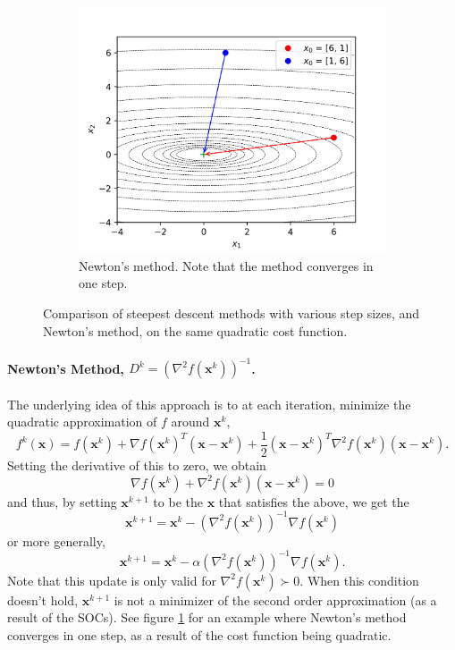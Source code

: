 \begin{figure}[!t]
\begin{subfigure}[b]{0.46\linewidth}
        \centering
        \includegraphics[width=\textwidth]{figs/newtonmethod.png}
        \caption{Newton's method. Note that the method converges in one step.}
        \label{fig:graddesc_newton}
    \end{subfigure}
    \caption{Comparison of steepest descent methods with various step sizes, and Newton's method, on the same quadratic cost function.}
    \label{fig:gradient_descent}
\end{figure}

\paragraph{Newton's Method, $D^k = (\nabla^2 f(\bm{x}^k))^{-1}$.} The underlying idea of this approach is to at each iteration, minimize the quadratic approximation of $f$ around $\bm{x}^k$,
\begin{equation}
    f^k(\bm{x}) = f(\bm{x}^k) + \nabla f(\bm{x}^k)^T (\bm{x} - \bm{x}^k) + \frac{1}{2} (\bm{x} - \bm{x}^k)^T \nabla^2 f(\bm{x}^k) (\bm{x} - \bm{x}^k).
\end{equation}
Setting the derivative of this to zero, we obtain 
\begin{equation}
    \nabla f(\bm{x}^k) + \nabla^2 f(\bm{x}^k) (\bm{x} - \bm{x}^k) = 0
\end{equation}
and thus, by setting $\bm{x}^{k+1}$ to be the $\bm{x}$ that satisfies the above, we get the
\begin{equation}
    \bm{x}^{k+1} = \bm{x}^k - (\nabla^2 f(\bm{x}^k))^{-1} \nabla f(\bm{x}^k)
\end{equation}
or more generally, 
\begin{equation}
    \bm{x}^{k+1} = \bm{x}^k - \alpha (\nabla^2 f(\bm{x}^k))^{-1} \nabla f(\bm{x}^k).
\end{equation}
Note that this update is only valid for $\nabla^2 f(\bm{x}^k) \succ 0$. When this condition doesn't hold, $\bm{x}^{k+1}$ is not a minimizer of the second order approximation (as a result of the SOCs). See figure \ref{fig:graddesc_newton} for an example where Newton's method converges in one step, as a result of the cost function being quadratic. 

